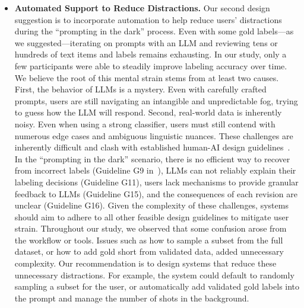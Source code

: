 \begin{itemize}
\item
\textbf{Automated Support to Reduce Distractions.}
Our second design suggestion is to incorporate automation to help reduce users' distractions during the ``prompting in the dark'' process. 
Even with some gold labels---as we suggested---iterating on prompts with an LLM and reviewing tens or hundreds of text items and labels remains exhausting. 
In our study, only a few participants were able to steadily improve labeling accuracy over time.
We believe the root of this mental strain stems from at least two causes.
First, the behavior of LLMs is a mystery. 
Even with carefully crafted prompts, users are still navigating an intangible and unpredictable fog, trying to guess how the LLM will respond.
Second, real-world data is inherently noisy. 
Even when using a strong classifier, users must still contend with numerous edge cases and ambiguous linguistic nuances. 
These challenges are inherently difficult and clash with established human-AI design guidelines~\cite{amershi2019guidelines}. 
In the ``prompting in the dark'' scenario, there is no efficient way to recover from incorrect labels (Guideline G9 in~\cite{amershi2019guidelines}), LLMs can not reliably explain their labeling decisions (Guideline G11), users lack mechanisms to provide granular feedback to LLMs (Guideline G15), and the consequences of each revision are unclear (Guideline G16).
Given the complexity of these challenges, systems should aim to adhere to all other feasible design guidelines to mitigate user strain.
Throughout our study, %
we observed that some confusion arose from the workflow or tools. 
Issues such as how to sample a subset from the full dataset, or how to add gold short from validated data, added unnecessary complexity.
Our recommendation is to design systems that reduce these unnecessary distractions. 
For example, the system could default to randomly sampling a subset for the user, or automatically add validated gold labels into the prompt and manage the number of shots in the background. 



\end{itemize}
